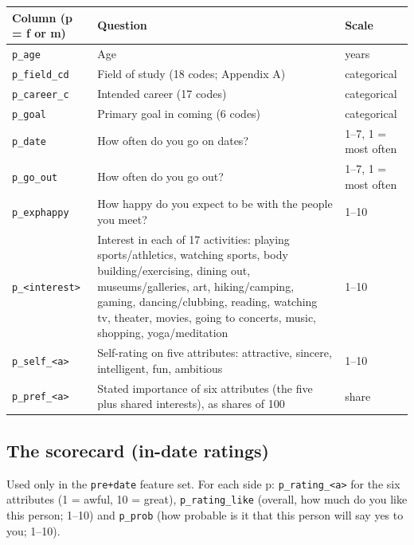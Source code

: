 \documentclass[11pt]{article}
\begin{document}
\small
\begin{center}
\begin{tabular}{L{3.6cm}L{8.6cm}L{3cm}}
\toprule
\textbf{Column (p = f or m)} & \textbf{Question} & \textbf{Scale} \\
\midrule
\texttt{p\_age} & Age & years \\
\texttt{p\_field\_cd} & Field of study (18 codes; Appendix A) & categorical \\
\texttt{p\_career\_c} & Intended career (17 codes) & categorical \\
\texttt{p\_goal} & Primary goal in coming (6 codes) & categorical \\
\texttt{p\_date} & How often do you go on dates? & 1--7, 1 = most often \\
\texttt{p\_go\_out} & How often do you go out? & 1--7, 1 = most often \\
\texttt{p\_exphappy} & How happy do you expect to be with the people you meet? & 1--10 \\
\texttt{p\_<interest>} & Interest in each of 17 activities: playing sports/athletics, watching sports, body building/exercising, dining out, museums/galleries, art, hiking/camping, gaming, dancing/clubbing, reading, watching tv, theater, movies, going to concerts, music, shopping, yoga/meditation & 1--10 \\
\texttt{p\_self\_<a>} & Self-rating on five attributes: attractive, sincere, intelligent, fun, ambitious & 1--10 \\
\texttt{p\_pref\_<a>} & Stated importance of six attributes (the five plus shared interests), as shares of 100 & share \\
\bottomrule
\end{tabular}
\end{center}
\par\medskip
\normalsize

\subsection{The scorecard (in-date ratings)}

Used only in the \texttt{pre+date} feature set. For each side p: \texttt{p\_rating\_<a>} for the six attributes (1 = awful, 10 = great), \texttt{p\_rating\_like} (overall, how much do you like this person; 1--10) and \texttt{p\_prob} (how probable is it that this person will say yes to you; 1--10).
\end{document}
